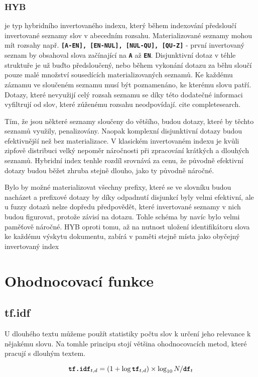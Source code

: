 \documentclass[12pt,letterpaper,oneside,openright]{book}
\newcommand{\bftt}[1]{\texttt{\textbf{#1}}}
\begin{document}
\subsubsection{HYB} je typ hybridního invertovaného indexu, který během
indexování předsloučí invertované seznamy slov v abecedním rozsahu.
Materializované seznamy mohou mít rozsahy např. \bftt{[A-EN], [EN-NUL],
[NUL-QU], [QU-Z]} - první invertovaný seznam by obsahoval slova
začínající na \bftt{A} až \bftt{EN}. Disjunktivní dotaz v téhle
struktuře je už buďto předsloučený, nebo během vykonání dotazu za běhu
sloučí pouze malé množství sousedících materializovaných seznamů. Ke
každému záznamu ve sloučeném seznamu musí být poznamenáno, ke kterému
slovu patří. Dotazy, které nevyužijí celý rozsah seznamu se díky této
dodatečné informaci vyfiltrují od slov, které zúženému rozsahu
neodpovídají. cite completesearch.

Tím, že jsou některé seznamy sloučeny do většího, budou dotazy, které by těchto
seznamů využily, penalizovány. Naopak komplexní disjunktivní dotazy budou
efektivnější než bez materializace. V klasickém invertovaném indexu je kvůli
zipfově distribuci velký nepoměr náročnosti při zpracování krátkých a dlouhých
seznamů. Hybridní index tenhle rozdíl srovnává za cenu, že původně efektivní
dotazy budou běžet zhruba stejně dlouho, jako ty původně náročné.

Bylo by možné materializovat všechny prefixy, které se ve slovníku budou
nacházet a prefixové dotazy by díky odpadnutí disjunkcí byly velmi efektivní,
ale u fuzzy dotazů nelze dopředu předpovědět, které invertované seznamy v nich
budou figurovat, protože závisí na dotazu. Tohle schéma by navíc bylo velmi
paměťově náročné. HYB oproti tomu, až na nutnost uložení identifikátoru slova
ke každému výskytu dokumentu, zabírá v paměti stejně místa jako obyčejný
invertovaný index


\section{Ohodnocovací funkce}

\subsection{tf.idf}
U dlouhého textu můžeme použít statistiky počtu slov k určení jeho
relevance k nějakému slovu. Na tomhle principu stojí většina
ohodnocovacích metod, které pracují s dlouhým textem. 

$$
\bftt{tf.idf}_{t, d} = (1 + \log \bftt{tf}_{t, d}) \times \log_{10} N / \bftt{df}_{t}
$$
\end{document}
